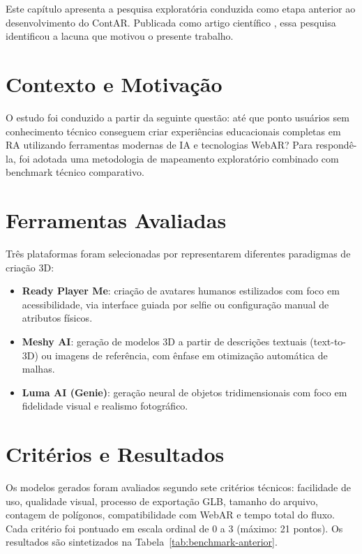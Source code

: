 \documentclass[
  12pt,
  openright,
  twoside,
  a4paper,
  english,
  brazil
]{abntex2}
\begin{document}
Este capítulo apresenta a pesquisa exploratória conduzida como etapa
anterior ao desenvolvimento do ContAR. Publicada como artigo científico
\cite{freitas2025benchmark}, essa pesquisa identificou a lacuna que
motivou o presente trabalho.

\section{Contexto e Motivação}
\label{sec:benchmark-contexto}

O estudo foi conduzido a partir da seguinte questão: até que ponto usuários
sem conhecimento técnico conseguem criar experiências educacionais completas
em RA utilizando ferramentas modernas de IA e tecnologias WebAR? Para
respondê-la, foi adotada uma metodologia de mapeamento exploratório combinado
com benchmark técnico comparativo.

\section{Ferramentas Avaliadas}
\label{sec:benchmark-ferramentas}

Três plataformas foram selecionadas por representarem diferentes paradigmas
de criação 3D:

\begin{itemize}
  \item \textbf{Ready Player Me}: criação de avatares humanos estilizados
        com foco em acessibilidade, via interface guiada por selfie ou
        configuração manual de atributos físicos.
  \item \textbf{Meshy AI}: geração de modelos 3D a partir de descrições
        textuais (text-to-3D) ou imagens de referência, com ênfase em
        otimização automática de malhas.
  \item \textbf{Luma AI (Genie)}: geração neural de objetos tridimensionais
        com foco em fidelidade visual e realismo fotográfico.
\end{itemize}

\section{Critérios e Resultados}
\label{sec:benchmark-resultados}

Os modelos gerados foram avaliados segundo sete critérios técnicos:
facilidade de uso, qualidade visual, processo de exportação GLB, tamanho
do arquivo, contagem de polígonos, compatibilidade com WebAR e tempo total
do fluxo. Cada critério foi pontuado em escala ordinal de 0 a 3 (máximo: 21
pontos). Os resultados são sintetizados na Tabela~\ref{tab:benchmark-anterior}.
\end{document}
